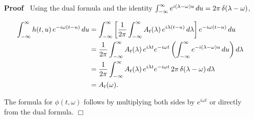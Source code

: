 \documentclass{article}
\newenvironment{proof}{\noindent\textbf{Proof\ }}{\hspace*{\fill}$\Box$\medskip}
\begin{document}
\begin{proof}
  Using the dual formula and the identity $\int_{- \infty}^{\infty} e^{i
  (\lambda - \omega) u}  \hspace{0.17em} du = 2 \pi \hspace{0.17em} \delta
  (\lambda - \omega)$,
  
  \begin{align*}
    \int_{- \infty}^{\infty} h (t, u)  \hspace{0.17em} e^{- i \omega (t - u)} 
    \hspace{0.17em} du & = \int_{- \infty}^{\infty} \left[ \frac{1}{2 \pi} 
    \int_{- \infty}^{\infty} A_t (\lambda) \hspace{0.17em} e^{i \lambda (t -
    u)}  \hspace{0.17em} d \lambda \right] e^{- i \omega (t - u)} 
    \hspace{0.17em} du\\
    & = \frac{1}{2 \pi}  \int_{- \infty}^{\infty} A_t (\lambda) 
    \hspace{0.17em} e^{i \lambda t} e^{- i \omega t} \left( \int_{-
    \infty}^{\infty} e^{- i (\lambda - \omega) u}  \hspace{0.17em} du \right)
    d \lambda\\
    & = \frac{1}{2 \pi}  \int_{- \infty}^{\infty} A_t (\lambda) 
    \hspace{0.17em} e^{i \lambda t} e^{- i \omega t}  \hspace{0.17em} 2 \pi
    \hspace{0.17em} \delta (\lambda - \omega)  \hspace{0.17em} d \lambda\\
    & = A_t (\omega) .
  \end{align*}
  
  The formula for $\phi (t, \omega)$ follows by multiplying both sides by
  $e^{i \omega t}$ or directly from the dual formula.
\end{proof}
\end{document}
